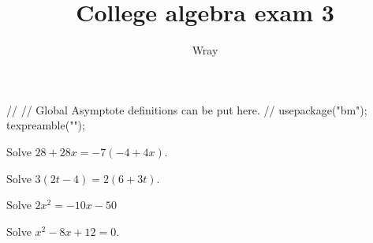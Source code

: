 \documentclass[addpoints, 12pt]{exam}
\title{College algebra exam 3}
\author{Wray}
\begin{document}
\begin{asydef}
//
// Global Asymptote definitions can be put here.
//
usepackage("bm");
texpreamble("\def\V#1{\bm{#1}}");
\end{asydef}



\bigskip

             
\bigskip
\bigskip

\smallskip

\begin{questions}

\question[5]
Solve $28 + 28x = -7 \left( -4 + 4x \right)$.


\question[5]
Solve $3 \left( 2t - 4 \right) = 2 \left( 6 + 3t \right)$.


\newpage

\question[5]
Solve $2x^2 = - 10x - 50$


\question[5]
Solve $x^2 - 8x + 12 = 0$.


\end{questions}
\end{document}
